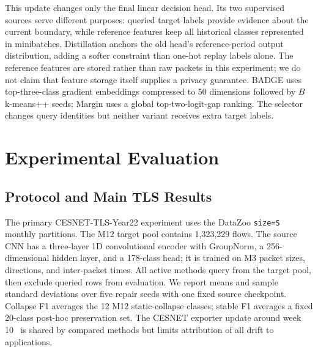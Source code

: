 \documentclass[journal]{IEEEtran}
\begin{document}
This update changes only the final linear decision head. Its two supervised sources serve different purposes: queried target labels provide evidence about the current boundary, while reference features keep all historical classes represented in minibatches. Distillation anchors the old head's reference-period output distribution, adding a softer constraint than one-hot replay labels alone. The reference features are stored rather than raw packets in this experiment; we do not claim that feature storage itself supplies a privacy guarantee. BADGE uses top-three-class gradient embeddings compressed to 50 dimensions followed by $B$ k-means++ seeds; Margin uses a global top-two-logit-gap ranking. The selector changes query identities but neither variant receives extra target labels.

\section{Experimental Evaluation}
\label{sec:experiments}
\subsection{Protocol and Main TLS Results}
The primary CESNET-TLS-Year22 experiment uses the DataZoo \texttt{size=S} monthly partitions. The M12 target pool contains 1,323,229 flows. The source CNN has a three-layer 1D convolutional encoder with GroupNorm, a 256-dimensional hidden layer, and a 178-class head; it is trained on M3 packet sizes, directions, and inter-packet times. All active methods query from the target pool, then exclude queried rows from evaluation. We report means and sample standard deviations over five repair seeds with one fixed source checkpoint. Collapse F1 averages the 12 M12 static-collapse classes; stable F1 averages a fixed 20-class post-hoc preservation set. The CESNET exporter update around week 10~\cite{hynek2024cesnet} is shared by compared methods but limits attribution of all drift to applications.
\end{document}
